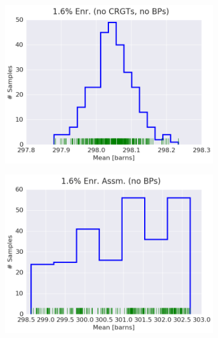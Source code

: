 \begin{figure}[h!]
\centering
\begin{subfigure}{0.5\textwidth}
  \centering
  \includegraphics[width=\linewidth]{figures/patterns/assm-1.6-inf/hist-kde-rug/assm-16-inf-fiss-2}
  \caption{}
  \label{fig:chap9-hist-assm-1.6-inf-fiss}
\end{subfigure}%
\begin{subfigure}{0.5\textwidth}
  \centering
  \includegraphics[width=\linewidth]{figures/patterns/assm-1.6/hist-kde-rug/assm-16-fiss-2}
  \caption{}
  \label{fig:chap9-hist-assm-1.6-fiss}
\end{subfigure}
\begin{subfigure}{0.5\textwidth}

\end{subfigure}
\end{figure}
